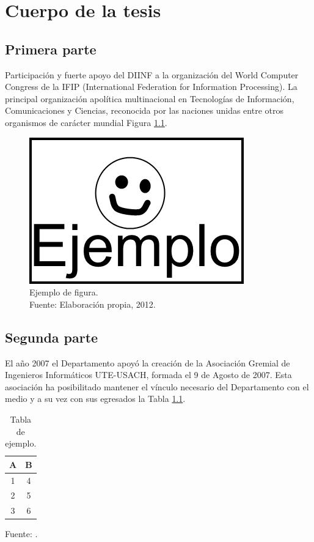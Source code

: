 \chapter{Cuerpo de la tesis}
\label{cap:cuerpo}

\section{Primera parte}
\label{sec:primera}
Participación y fuerte apoyo del DIINF a la organización del World Computer Congress de la IFIP (International Federation for Information Processing). La principal organización apolítica multinacional en Tecnologías de Información, Comunicaciones y Ciencias, reconocida por las naciones unidas entre otros organismos de carácter mundial Figura \ref{fig:ejemplo}.

\begin{figure}[!ht]
	\centering
	\captionsetup{justification=centering}
	\includegraphics[scale=0.6]{images/Ejemplo.png}
	\caption[Ejemplo de figura.]{Ejemplo de figura.\\Fuente: Elaboraci\'on propia, 2012.}
	\label{fig:ejemplo}
\end{figure}

\section{Segunda parte}
\label{sec:segunda}

El año 2007 el Departamento apoyó la creación de la Asociación Gremial de Ingenieros Informáticos UTE-USACH, formada el 9 de Agosto de 2007. Esta asociación ha posibilitado mantener el vínculo necesario del Departamento con el medio y a su vez con sus egresados la Tabla \ref{tab:ejemplo}.

\begin{table}[!ht]
	\begin{center}
		\caption{Tabla de ejemplo.}
		\begin{tabular}{| c | c |}
			\hline
			A & B \\ \hline
			1 & 4 \\
			2 & 5 \\
			3 & 6 \\\hline
		\end{tabular}
		\label{tab:ejemplo}
	\end{center}
	\begin{center}
		Fuente: \cite{MeriaudeauS15}.
	\end{center}
\end{table}

